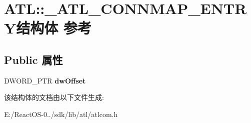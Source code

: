\hypertarget{struct_a_t_l_1_1___a_t_l___c_o_n_n_m_a_p___e_n_t_r_y}{}\section{A\+TL\+:\+:\+\_\+\+A\+T\+L\+\_\+\+C\+O\+N\+N\+M\+A\+P\+\_\+\+E\+N\+T\+R\+Y结构体 参考}
\label{struct_a_t_l_1_1___a_t_l___c_o_n_n_m_a_p___e_n_t_r_y}
\subsection*{Public 属性}
\begin{DoxyCompactItemize}
\item 
\mbox{\label{struct_a_t_l_1_1___a_t_l___c_o_n_n_m_a_p___e_n_t_r_y_a99383086c9ea7d5d8c769b62cccd09c7}} 
D\+W\+O\+R\+D\+\_\+\+P\+TR {\bfseries dw\+Offset}
\end{DoxyCompactItemize}


该结构体的文档由以下文件生成\+:\begin{DoxyCompactItemize}
\item 
E\+:/\+React\+O\+S-\/0../sdk/lib/atl/atlcom.\+h\end{DoxyCompactItemize}
